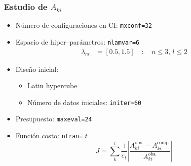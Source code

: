 \documentclass{beamer}
\begin{document}
\begin{frame}[t]
\frametitle{Estudio de $A_{ki}$}

\begin{itemize}
\item Número de configuraciones en CI: \texttt{mxconf=32}
\item Espacio de hiper--parámetros: \texttt{nlamvar=6} 
  \vspace{-0.25cm}
  \begin{align*} 
    \lambda_{nl} &=[0.5,1.5] \quad:\quad n\le 3,\,l\le 2
  \end{align*}
\vspace{-0.8cm}
\item Diseño inicial: 
  \begin{itemize}
    \item Latin hypercube
    \item Número de datos iniciales: \texttt{initer=60}
  \end{itemize}
\item Presupuesto: \texttt{maxeval=24}
\item Función costo: \texttt{ntran=} $t$
$$J=\sum_k^{t} \frac{1}{e_t}\left|\frac{A_{ki}^{\textrm{obs.}}-A_{ki}^{\textrm{comp.}}}{A_{ki}^{\textrm{obs.}}}\right|$$
\end{itemize}

\end{frame}
\end{document}
